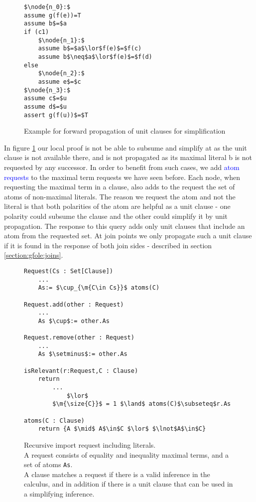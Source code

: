 \begin{figure}
\begin{lstlisting}
$\node{n_0}:$
assume g(f(e))=T
assume b$=$a
if (c1)
	$\node{n_1}:$	
	assume b$=$a$\lor$f(e)$=$f(c)
	assume b$\neq$a$\lor$f(e)$=$f(d)
else	
	$\node{n_2}:$
	assume e$=$c
$\node{n_3}:$
assume c$=$u
assume d$=$u
assert g(f(u))$=$T
\end{lstlisting}
\caption{Example for forward propagation of unit clauses for simplification\\
}
\label{snippet4.1.2.2}
\end{figure}

In figure \ref{snippet4.1.2.2} our local proof is not be able to subsume
 and simplify  at  as the unit clause  is not available there, and is not propagated as its maximal literal b is not requested by any successor.
In order to benefit from such cases, we add \textcolor{blue}{atom requests} to the maximal term requests we have seen before.
Each node, when requesting the maximal term in a clause, also adds to the request the set of atoms of non-maximal literals.
The reason we request the atom and not the literal is that both polarities of the atom are helpful as a unit clause - one polarity could subsume the clause and the other could simplify it by unit propagation.
The response to this query adds only unit clauses that include an atom from the requested set. 
At join points we only propagate such a unit clause if it is found in the response of both join sides - described in section \ref{section:gfole:joins}.

\begin{figure}
\begin{lstlisting}
Request(Cs : Set[Clause])
	...
	As:= $\cup_{\m{C\in Cs}}$ atoms(C)
	
Request.add(other : Request)
	...
	As $\cup$:= other.As
	
Request.remove(other : Request)
	...
	As $\setminus$:= other.As

isRelevant(r:Request,C : Clause)
	return 
		...
			$\lor$
		$\m{\size{C}}$ = 1 $\land$ atoms(C)$\subseteq$r.As
			
atoms(C : Clause)
	return {A $\mid$ A$\in$C $\lor$ $\lnot$A$\in$C}
\end{lstlisting}
\caption{Recursive import request including literals.\\
A request consists of equality and inequality maximal terms, and a set of atoms \lstinline|As|.\\
A clause matches a request if there is a valid inference in the calculus,
and in addition if there is a unit clause that can be used in a simplifying inference.\\
}
\label{basic_verification.4.request_literals}
\end{figure}

